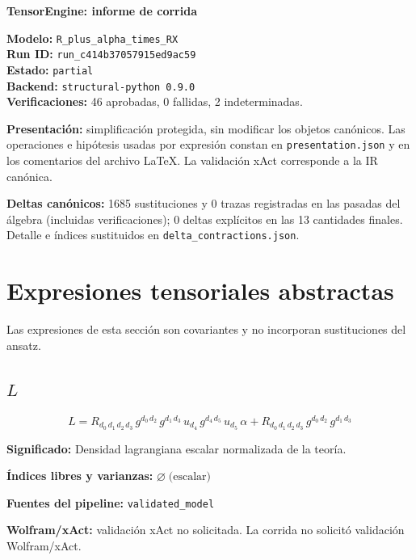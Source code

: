 \documentclass[11pt]{article}
\begin{document}
\begin{center}
{\Large\bfseries TensorEngine: informe de corrida}
\end{center}
\textbf{Modelo:} \texttt{R\_plus\_alpha\_times\_RX}\\
\textbf{Run ID:} \texttt{run\_c414b37057915ed9ac59}\\
\textbf{Estado:} \texttt{partial}\\
\textbf{Backend:} \texttt{structural-python 0.9.0}\\
\textbf{Verificaciones:} 46 aprobadas, 0 fallidas, 2 indeterminadas.
\par\smallskip
\textbf{Presentación:} simplificación protegida, sin modificar los objetos canónicos. Las operaciones e hipótesis usadas por expresión constan en \texttt{presentation.json} y en los comentarios del archivo LaTeX. La validación xAct corresponde a la IR canónica.\par
\textbf{Deltas canónicos:} 1685 sustituciones y 0 trazas registradas en las pasadas del álgebra (incluidas verificaciones); 0 deltas explícitos en las 13 cantidades finales. Detalle e índices sustituidos en \texttt{delta\_contractions.json}.\par
\section*{Expresiones tensoriales abstractas}
Las expresiones de esta sección son covariantes y no incorporan sustituciones del ansatz.
\subsection*{$ L $}
\begin{dmath*}[breakdepth={5}]
L = R{}_{d_{0}\,d_{1}\,d_{2}\,d_{3}}\,g{}^{d_{0}\,d_{2}}\,g{}^{d_{1}\,d_{3}}\,u{}_{d_{4}}\,g{}^{d_{4}\,d_{5}}\,u{}_{d_{5}}\,\alpha + R{}_{d_{0}\,d_{1}\,d_{2}\,d_{3}}\,g{}^{d_{0}\,d_{2}}\,g{}^{d_{1}\,d_{3}}
\end{dmath*}
\par\vspace{1.2\baselineskip}\noindent
\begin{minipage}{\linewidth}
\textbf{Significado:} Densidad lagrangiana escalar normalizada de la teoría.\par
\textbf{Índices libres y varianzas:} $ \varnothing\;\text{(escalar)} $\par
\textbf{Fuentes del pipeline:} \texttt{validated\_model}\par
\textbf{Wolfram/xAct:} validación xAct no solicitada. La corrida no solicitó validación Wolfram/xAct.\par
\end{minipage}
\end{document}
